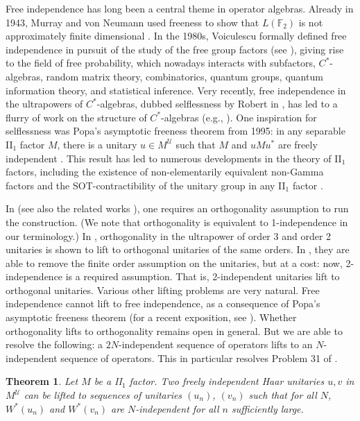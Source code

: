 \documentclass[10pt]{amsart}
\numberwithin{equation}{section}
\newtheorem{main}{Theorem}
\theoremstyle{definition}
\newcommand{\F}{\mathbb{F}}
\newcommand{\cU}{\mathcal{U}}
\begin{document}
Free independence has long been a central theme in operator algebras. Already in 1943, Murray and von Neumann used freeness to show that $L(\F_2)$ is not approximately finite dimensional \cite{MvN43}. In the 1980s, Voiculescu formally defined free independence in pursuit of the study of the free group factors (see \cite{voiculescu2006symmetries}), giving rise to the field of free probability, which nowadays interacts with subfactors, $C^*$-algebras, random matrix theory, combinatorics, quantum groups, quantum information theory, and statistical inference. Very recently, free independence in the ultrapowers of $C^*$-algebras, dubbed selflessness by Robert in \cite{robert2025selfless}, has led to a flurry of work on the structure of $C^*$-algebras (e.g., \cite{amrutam2025strict,ozawa2025proximality}). One inspiration for selflessness was Popa's asymptotic freeness theorem from 1995: in any separable II$_1$ factor $M$, there is a unitary $u\in M^\cU$ such that $M$ and $uMu^*$ are freely independent \cite{popa1995free}. This result has led to numerous developments in the theory of II$_1$ factors, including the existence of non-elementarily equivalent non-Gamma factors \cite{chifan2023exotic} and the SOT-contractibility of the unitary group in any II$_1$ factor \cite{jekel2025unitary}.

In \cite{chifan2023exotic} (see also the related works \cite{elayavalli2025sequential,patchell20253,gao2026exotic}), one requires an orthogonality assumption to run the construction. (We note that orthogonality is equivalent to 1-independence in our terminology.) In \cite{chifan2023exotic}, orthogonality in the ultrapower of order 3 and order 2 unitaries is shown to lift to orthogonal unitaries of the same orders. In \cite{houdayer2023asymptotic}, they are able to remove the finite  order assumption on the unitaries, but at a cost: now, 2-independence is a required assumption. That is, 2-independent unitaries lift to orthogonal unitaries. Various other lifting problems are very natural. Free independence cannot lift to free independence, as a consequence of Popa's asymptotic freeness theorem (for a recent exposition, see \cite{boulanger2025free}). Whether orthogonality lifts to orthogonality remains open in general. But we are able to resolve the following: a $2N$-independent sequence of operators lifts to an $N$-independent sequence of operators. This in particular resolves Problem 31 of \cite{elayavalli2025}. 

\begin{main}\label{mthm-sri-problem}
    Let $M$ be a II$_1$ factor. Two freely independent Haar unitaries $u,v$ in $M^\cU$ can be lifted to sequences of unitaries $(u_n)$, $(v_n)$ such that for all $N$, $W^*(u_n)$ and $W^*(v_n)$ are $N$-independent for all $n$ sufficiently large.
\end{main}
\end{document}
